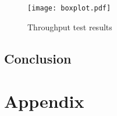 \documentclass[12pt, a4paper]{scrartcl}
\begin{document}
\begin{figure}
    \centering
    \texttt{[image: boxplot.pdf]}
    \caption{Throughput test results}\label{fig::boxres}
\end{figure}

\subsection{Conclusion}

\newpage
\renewcommand{\thesubsection}{\Alph{subsection}}
\setcounter{page}{\value{lastroman}}
\section*{Appendix}


\newpage
\listoffigures

\end{document}

